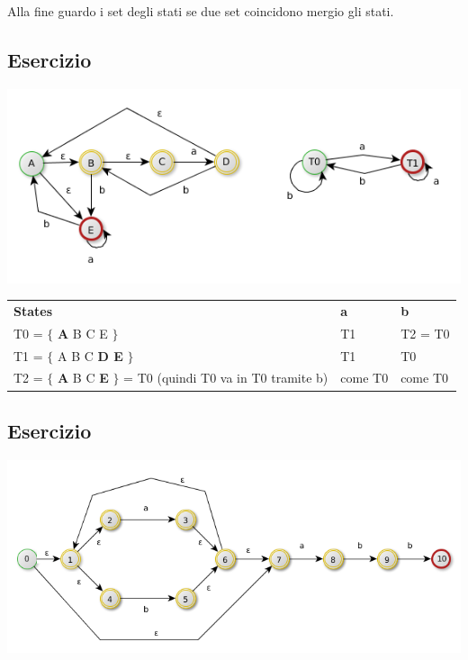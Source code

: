 Alla fine guardo i set degli stati se due set coincidono mergio gli stati.

\subsection{Esercizio}
\begin{center}
	\includegraphics[scale=0.5]{Chapters/Img/c02_05.png}\\
\end{center} 

\begin{tabular}{lll}
    \textbf{States}                                 &   \textbf{a}        &     \textbf{b} \\
    T0 = $\{$ \textbf{A} B C E $\}$                 &   T1                &     T2  = T0\\
    T1 = $\{$ A B C \textbf{D E} $\}$               &   T1                &     T0 \\
    T2 = $\{$ \textbf{A} B C \textbf{E} $\}$ = T0 (quindi T0 va in T0 tramite b) & come T0 & come T0 \\
\end{tabular}

\subsection{Esercizio}
\begin{center}
	\includegraphics[scale=0.5]{Chapters/Img/c02_03.png}\\
\end{center} 

